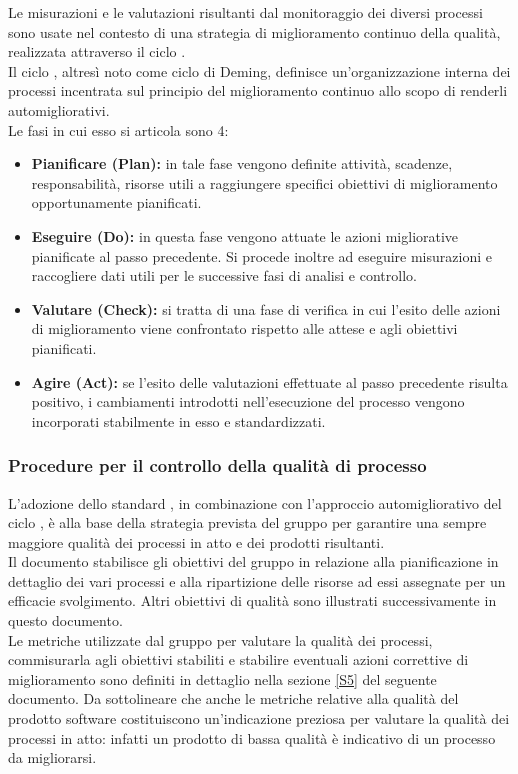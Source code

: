 Le misurazioni e le valutazioni risultanti dal monitoraggio dei diversi processi sono usate nel contesto di una strategia di miglioramento continuo della qualità, realizzata attraverso il ciclo .
\\Il ciclo , altresì noto come ciclo di Deming, definisce un'organizzazione interna dei processi incentrata sul principio del miglioramento continuo allo scopo di renderli automigliorativi.
\\Le fasi in cui esso si articola sono 4:
	\begin{itemize}
		\item \textbf{Pianificare (Plan):} in tale fase vengono definite attività, scadenze, responsabilità, risorse utili a raggiungere specifici obiettivi di miglioramento opportunamente pianificati.
		\item \textbf{Eseguire (Do):} in questa fase vengono attuate le azioni migliorative pianificate al passo precedente. Si procede inoltre ad eseguire misurazioni e raccogliere dati utili per le successive fasi di analisi e controllo.
		\item \textbf{Valutare (Check):} si tratta di una fase di verifica in cui l'esito delle azioni di miglioramento viene confrontato rispetto alle attese e agli obiettivi pianificati.
		\item \textbf{Agire (Act):} se l'esito delle valutazioni effettuate al passo precedente risulta positivo, i cambiamenti introdotti nell'esecuzione del processo vengono incorporati stabilmente in esso e standardizzati.
	\end{itemize}

		\subsubsection{Procedure per il controllo della qualità di processo}
		L'adozione dello standard , in combinazione con l'approccio automigliorativo del 		ciclo , è alla base della strategia prevista del gruppo per garantire una sempre maggiore qualità dei processi in atto e dei prodotti risultanti.
\\Il documento \PdP stabilisce gli obiettivi del gruppo in relazione alla pianificazione in dettaglio dei vari processi e alla ripartizione delle risorse ad essi assegnate per un efficacie svolgimento. Altri obiettivi di qualità sono illustrati successivamente in questo documento.
\\Le metriche utilizzate dal gruppo per valutare la qualità dei processi, commisurarla agli obiettivi stabiliti e stabilire eventuali azioni correttive di miglioramento sono definiti in dettaglio nella sezione \ref{S5} del seguente documento. Da sottolineare che anche le metriche relative alla qualità del prodotto software costituiscono un'indicazione preziosa per valutare la qualità dei processi in atto: infatti un prodotto di bassa qualità è indicativo di un processo da migliorarsi.

